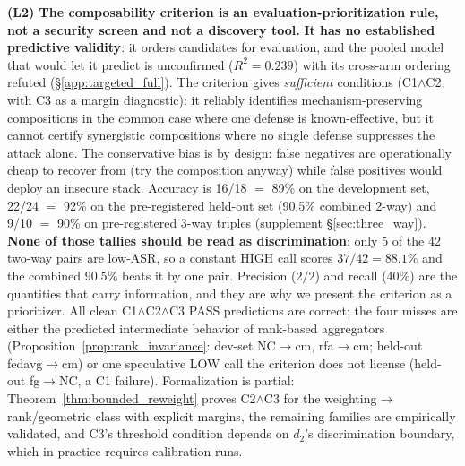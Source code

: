 \documentclass{article}
\begin{document}
\textbf{(L2) The composability criterion is an evaluation-prioritization rule, not a security screen and not a discovery tool.} \textbf{It has no established predictive validity}: it orders candidates for evaluation, and the pooled model that would let it predict is unconfirmed ($R^2{=}0.239$) with its cross-arm ordering refuted (§\ref{app:targeted_full}). The criterion gives \emph{sufficient} conditions (C1$\wedge$C2, with C3 as a margin diagnostic): it reliably identifies mechanism-preserving compositions in the common case where one defense is known-effective, but it cannot certify synergistic compositions where no single defense suppresses the attack alone. The conservative bias is by design: false negatives are operationally cheap to recover from (try the composition anyway) while false positives would deploy an insecure stack. Accuracy is 16/18 $=$ 89\% on the development set, 22/24 $=$ 92\% on the pre-registered held-out set (90.5\% combined 2-way) and 9/10 $=$ 90\% on pre-registered 3-way triples (supplement §\ref{sec:three_way}). \textbf{None of those tallies should be read as discrimination}: only 5 of the 42 two-way pairs are low-ASR, so a constant HIGH call scores $37/42 = 88.1\%$ and the combined $90.5\%$ beats it by one pair. Precision ($2/2$) and recall ($40\%$) are the quantities that carry information, and they are why we present the criterion as a prioritizer. All clean C1$\wedge$C2$\wedge$C3 PASS predictions are correct; the four misses are either the predicted intermediate behavior of rank-based aggregators (Proposition~\ref{prop:rank_invariance}: dev-set NC$\to$cm, rfa$\to$cm; held-out fedavg$\to$cm) or one speculative LOW call the criterion does not license (held-out fg$\to$NC, a C1 failure). Formalization is partial: Theorem~\ref{thm:bounded_reweight} proves C2$\wedge$C3 for the weighting$\to$rank/geometric class with explicit margins, the remaining families are empirically validated, and C3's threshold condition depends on $d_2$'s discrimination boundary, which in practice requires calibration runs.
\end{document}
